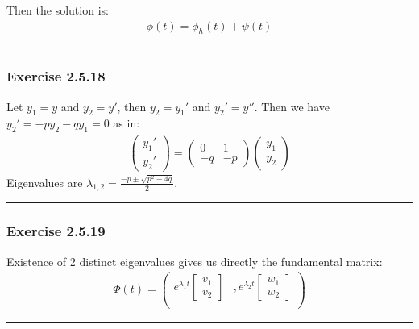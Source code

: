 \documentclass[12pt, letterpaper]{scrartcl}
\begin{document}
Then the solution is:
\begin{align*}
    \phi(t)=\phi_h(t)+\psi(t)
\end{align*}

\vskip1mm\hrule
\subsubsection*{Exercise 2.5.18}
Let $y_1=y$ and $y_2=y'$, then $y_2=y_1'$ and $y_2'=y''$. Then we have $y_2'=-py_2-qy_1=0$ as in:
\begin{align*}
    \left(\begin{array}{c}
        y_1' \\
        y_2'
    \end{array}\right)
    =
    \left(\begin{array}{cc}
        0 & 1 \\
        -q & -p 
    \end{array}\right)
    \left(\begin{array}{c}
        y_1 \\
        y_2
    \end{array}\right)
\end{align*}
Eigenvalues are $\lambda_{1,2}=\frac{-p\pm\sqrt{p^2-4q}}{2}$.
\vskip1mm\hrule
\subsubsection*{Exercise 2.5.19}
Existence of 2 distinct eigenvalues gives us directly the fundamental matrix:
\begin{align*}
    \Phi(t)=\left(\begin{array}{cc}
        e^{\lambda_1t}\left[\begin{array}{c}
        v_1 \\
        v_2
        \end{array}\right] &, e^{\lambda_2t}\left[\begin{array}{c}
        w_1 \\
        w_2
        \end{array}\right] \\
    \end{array}\right)
\end{align*}
\vskip1mm\hrule
\end{document}
